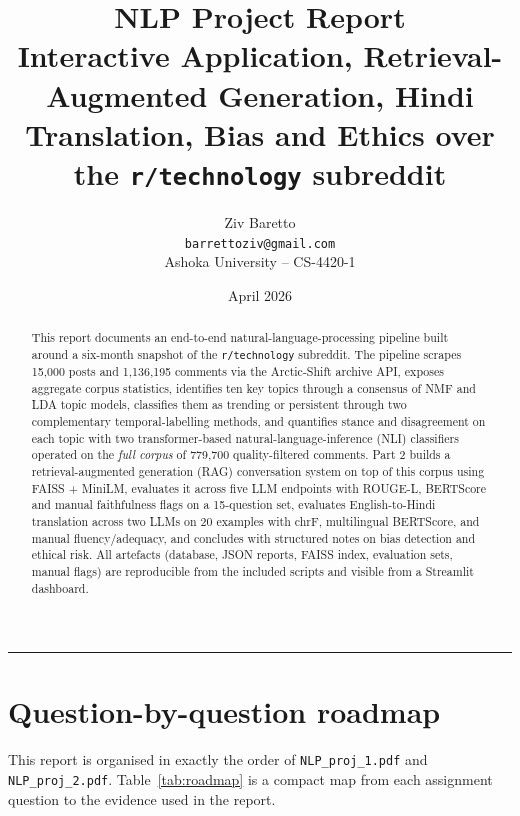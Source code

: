 \documentclass[11pt,a4paper]{article}
\title{\textbf{NLP Project Report} \\ \large Interactive Application, Retrieval-Augmented Generation, Hindi Translation, Bias and Ethics over the \texttt{r/technology} subreddit}
\author{Ziv Baretto \\ \texttt{barrettoziv@gmail.com} \\ Ashoka University -- CS-4420-1}
\date{April 2026}
\begin{document}
\maketitle

\begin{abstract}
\noindent
This report documents an end-to-end natural-language-processing pipeline built around a six-month
snapshot of the \texttt{r/technology} subreddit. The pipeline scrapes 15{,}000 posts and 1{,}136{,}195
comments via the Arctic-Shift archive API, exposes aggregate corpus statistics, identifies ten
key topics through a consensus of NMF and LDA topic models, classifies them as trending or persistent
through two complementary temporal-labelling methods, and quantifies stance and disagreement on each
topic with two transformer-based natural-language-inference (NLI) classifiers operated on the
\emph{full corpus} of 779{,}700 quality-filtered comments. Part 2 builds a retrieval-augmented
generation (RAG) conversation system on top of this corpus using FAISS + MiniLM, evaluates it across
five LLM endpoints with ROUGE-L, BERTScore and manual faithfulness flags on a 15-question set, evaluates
English-to-Hindi translation across two LLMs on 20 examples with chrF, multilingual BERTScore, and
manual fluency/adequacy, and concludes with structured notes on bias detection and ethical risk. All
artefacts (database, JSON reports, FAISS index, evaluation sets, manual flags) are reproducible from
the included scripts and visible from a Streamlit dashboard.
\end{abstract}

\tableofcontents
\vspace{1em}\hrule\vspace{0.5em}

\section*{Question-by-question roadmap}
This report is organised in exactly the order of \texttt{NLP\_proj\_1.pdf} and
\texttt{NLP\_proj\_2.pdf}. Table~\ref{tab:roadmap} is a compact map from each
assignment question to the evidence used in the report.
\end{document}
